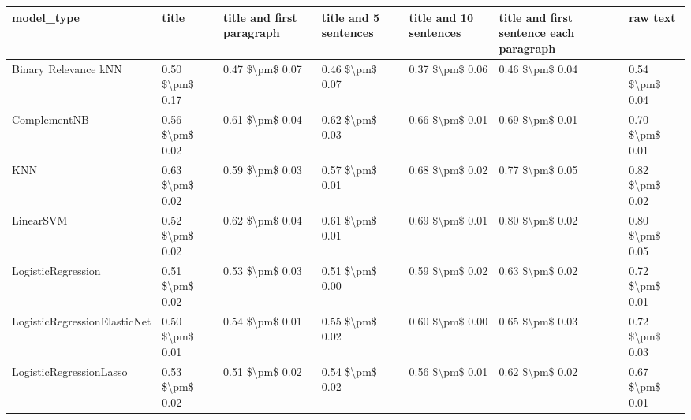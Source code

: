 \begin{tabular}{lllllll}
\toprule
                     model\_type &               title & title and first paragraph & title and 5 sentences & title and 10 sentences & title and first sentence each paragraph &        raw text \\
\midrule
           Binary Relevance kNN &     0.50 \$\textbackslash pm\$ 0.17 &           0.47 \$\textbackslash pm\$ 0.07 &       0.46 \$\textbackslash pm\$ 0.07 &        0.37 \$\textbackslash pm\$ 0.06 &                         0.46 \$\textbackslash pm\$ 0.04 & 0.54 \$\textbackslash pm\$ 0.04 \\
                   ComplementNB &     0.56 \$\textbackslash pm\$ 0.02 &           0.61 \$\textbackslash pm\$ 0.04 &       0.62 \$\textbackslash pm\$ 0.03 &        0.66 \$\textbackslash pm\$ 0.01 &                         0.69 \$\textbackslash pm\$ 0.01 & 0.70 \$\textbackslash pm\$ 0.01 \\
                            KNN &     0.63 \$\textbackslash pm\$ 0.02 &           0.59 \$\textbackslash pm\$ 0.03 &       0.57 \$\textbackslash pm\$ 0.01 &        0.68 \$\textbackslash pm\$ 0.02 &                         0.77 \$\textbackslash pm\$ 0.05 & 0.82 \$\textbackslash pm\$ 0.02 \\
                      LinearSVM &     0.52 \$\textbackslash pm\$ 0.02 &           0.62 \$\textbackslash pm\$ 0.04 &       0.61 \$\textbackslash pm\$ 0.01 &        0.69 \$\textbackslash pm\$ 0.01 &                         0.80 \$\textbackslash pm\$ 0.02 & 0.80 \$\textbackslash pm\$ 0.05 \\
             LogisticRegression &     0.51 \$\textbackslash pm\$ 0.02 &           0.53 \$\textbackslash pm\$ 0.03 &       0.51 \$\textbackslash pm\$ 0.00 &        0.59 \$\textbackslash pm\$ 0.02 &                         0.63 \$\textbackslash pm\$ 0.02 & 0.72 \$\textbackslash pm\$ 0.01 \\
   LogisticRegressionElasticNet &     0.50 \$\textbackslash pm\$ 0.01 &           0.54 \$\textbackslash pm\$ 0.01 &       0.55 \$\textbackslash pm\$ 0.02 &        0.60 \$\textbackslash pm\$ 0.00 &                         0.65 \$\textbackslash pm\$ 0.03 & 0.72 \$\textbackslash pm\$ 0.03 \\
        LogisticRegressionLasso &     0.53 \$\textbackslash pm\$ 0.02 &           0.51 \$\textbackslash pm\$ 0.02 &       0.54 \$\textbackslash pm\$ 0.02 &        0.56 \$\textbackslash pm\$ 0.01 &                         0.62 \$\textbackslash pm\$ 0.02 & 0.67 \$\textbackslash pm\$ 0.01 \\

\end{tabular}
